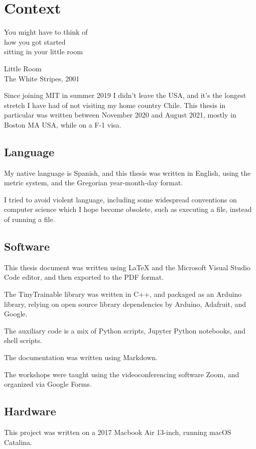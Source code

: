 \chapter{Context}

\epigraph{You might have to think  of \\ how you got started \\ sitting in your little room}{Little Room \\ The White Stripes, 2001}

Since joining MIT in summer 2019 I didn't leave the USA, and it's the longest stretch I have had of not visiting my home country Chile. This thesis in particular was written between November 2020 and August 2021, mostly in Boston MA USA, while on a F-1 visa.

\section{Language}

My native language is Spanish, and this thesis was written in English, using the metric system, and the Gregorian year-month-day format.

I tried to avoid violent language, including some widespread conventions on computer science which I hope become obsolete, such as executing a file, instead of running a file.

\section{Software}

This thesis document was written using LaTeX and the Microsoft Visual Studio Code editor, and then exported to the PDF format.

The TinyTrainable library was written in C++, and packaged as an Arduino library, relying on open source library dependencies by Arduino, Adafruit, and Google.

The auxiliary code is a mix of Python scripts, Jupyter Python notebooks, and shell scripts.

The documentation was written using Markdown.

The workshops were taught using the videoconferencing software Zoom, and organized via Google Forms.

\section{Hardware}

This project was written on a 2017 Macbook Air 13-inch, running macOS Catalina.

